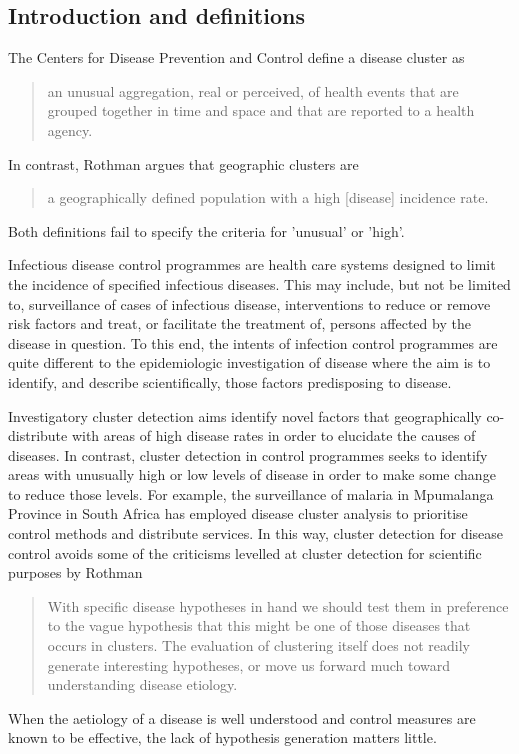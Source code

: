 \documentclass[a4paper,11pt]{article}
\begin{document}
\subsection{Introduction and definitions}
The Centers for Disease Prevention and Control define a disease cluster as 
\begin{quotation}
 an unusual aggregation, real or perceived, of health events that are grouped together in time and space and that are reported to a health agency.\cite{cdc1990}
\end{quotation}
In contrast, Rothman argues that geographic clusters are 
\begin{quotation}
 a geographically defined population with a high [disease] incidence rate.\cite{Rothman1990}
\end{quotation}
Both definitions fail to specify the criteria for 'unusual' or 'high'. 

Infectious disease control programmes are health care systems designed to limit the incidence of specified infectious diseases. 
This may include, but not be limited to, surveillance of cases of infectious disease, interventions to reduce or remove risk factors and treat, or facilitate the treatment of, persons affected by the disease in question. 
To this end, the intents of infection control programmes are quite different to the epidemiologic investigation of disease where the aim is to identify, and describe scientifically, those factors predisposing to disease. 

Investigatory cluster detection aims identify novel factors that geographically co-distribute with areas of high disease rates in order to elucidate the causes of diseases.
In contrast, cluster detection in control programmes seeks to identify areas with unusually high or low levels of disease in order to make some change to reduce those levels. 
For example, the surveillance of malaria in Mpumalanga Province in South Africa has employed disease cluster analysis to prioritise control methods and distribute services. \cite{Coleman2009}
In this way, cluster detection for disease control avoids some of the criticisms levelled at cluster detection for scientific purposes by Rothman
\begin{quotation}
 With specific disease hypotheses in hand we should test them in preference to the vague hypothesis that this might be one of those diseases that occurs in clusters. The evaluation of clustering itself does not readily generate interesting hypotheses, or move us forward much toward understanding disease etiology. 
\end{quotation}
When the aetiology of a disease is well understood and control measures are known to be effective, the lack of hypothesis generation matters little. 
\end{document}
